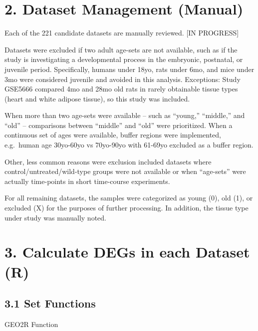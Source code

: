 \documentclass[
]{article}
\begin{document}
\hypertarget{dataset-management-manual}{%
\section{2. Dataset Management
(Manual)}\label{dataset-management-manual}}

Each of the 221 candidate datasets are manually reviewed. {[}IN
PROGRESS{]}

Datasets were excluded if two adult age-sets are not available, such as
if the study is investigating a developmental process in the embryonic,
postnatal, or juvenile period. Specifically, humans under 18yo, rats
under 6mo, and mice under 3mo were considered juvenile and avoided in
this analysis. Exceptions: Study GSE5666 compared 4mo and 28mo old rats
in rarely obtainable tissue types (heart and white adipose tissue), so
this study was included.

When more than two age-sets were available -- such as ``young,''
``middle,'' and ``old'' -- comparisons between ``middle'' and ``old''
were prioritized. When a continuous set of ages were available, buffer
regions were implemented, e.g.~human age 30yo-60yo vs 70yo-90yo with
61-69yo excluded as a buffer region.

Other, less common reasons were exclusion included datasets where
control/untreated/wild-type groups were not available or when
``age-sets'' were actually time-points in short time-course experiments.

For all remaining datasets, the samples were categorized as young (0),
old (1), or excluded (X) for the purposes of further processing. In
addition, the tissue type under study was manually noted.

\hypertarget{calculate-degs-in-each-dataset-r}{%
\section{3. Calculate DEGs in each Dataset
(R)}\label{calculate-degs-in-each-dataset-r}}

\hypertarget{set-functions}{%
\subsection{3.1 Set Functions}\label{set-functions}}

GEO2R Function
\end{document}
